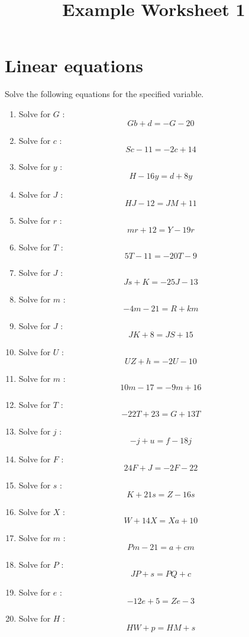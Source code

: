 \documentclass{article}
\begin{document}
    \title{Example Worksheet 1} 
 \date{\vspace{-5ex}} 
 \maketitle

        \section{Linear equations}
        Solve the following equations for the specified variable.
        \begin{multicols}{1}
        \begin{enumerate}
        \item Solve for $G$ : $$G b + d = - G - 20$$
\item Solve for $c$ : $$S c - 11 = - 2 c + 14$$
\item Solve for $y$ : $$H - 16 y = d + 8 y$$
\item Solve for $J$ : $$H J - 12 = J M + 11$$
\item Solve for $r$ : $$m r + 12 = Y - 19 r$$
\item Solve for $T$ : $$5 T - 11 = - 20 T - 9$$
\item Solve for $J$ : $$J s + K = - 25 J - 13$$
\item Solve for $m$ : $$- 4 m - 21 = R + k m$$
\item Solve for $J$ : $$J K + 8 = J S + 15$$
\item Solve for $U$ : $$U Z + h = - 2 U - 10$$
\item Solve for $m$ : $$10 m - 17 = - 9 m + 16$$
\item Solve for $T$ : $$- 22 T + 23 = G + 13 T$$
\item Solve for $j$ : $$- j + u = f - 18 j$$
\item Solve for $F$ : $$24 F + J = - 2 F - 22$$
\item Solve for $s$ : $$K + 21 s = Z - 16 s$$
\item Solve for $X$ : $$W + 14 X = X a + 10$$
\item Solve for $m$ : $$P m - 21 = a + c m$$
\item Solve for $P$ : $$J P + s = P Q + c$$
\item Solve for $e$ : $$- 12 e + 5 = Z e - 3$$
\item Solve for $H$ : $$H W + p = H M + s$$
        \end{enumerate}
        \end{multicols}
        
\end{document}
